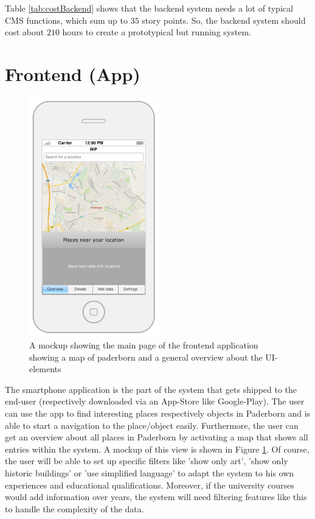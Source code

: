 Table \ref{tab:costBackend} shows that the backend system needs a lot of typical \ac{CMS} functions, which sum up to $35$ story points. So, the backend system should cost about $210$ hours to create a prototypical but running system. 

\section{Frontend (App)}
\begin{figure}[th]
\centerline{\includegraphics[width=0.5\textwidth]{gfx/mockup_app_1}}
\caption{A mockup showing the main page of the frontend application showing a map of paderborn and a general overview about the UI-elements}
\label{app1}
\end{figure}

The smartphone application is the part of the system that gets shipped to the end-user (respectively downloaded via an App-Store like Google-Play). The user can use the app to find interesting places respectively objects in Paderborn and is able to start a navigation to the place/object easily. Furthermore, the user can get an overview about all places in Paderborn by activating a map that shows all entries within the system. A mockup of this view is shown in Figure \ref{app1}. Of course, the user will be able to set up specific filters like 'show only art', 'show only historic buildings' or 'use simplified language' to adapt the system to his own experiences and educational qualifications. Moreover, if the university courses would add information over years, the system will need filtering features like this to handle the complexity of the data.

